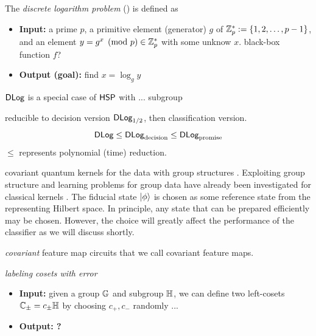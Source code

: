 \begin{problem}\label{prm:dlog}
	The \emph{discrete logarithm problem} (\dlog) is defined as
	\begin{itemize}
		\item \textbf{Input:} a prime $p$, a primitive element (generator) $g$ of $\mathbb{Z}_p^*:=\qty{1,2,\dots,p-1}$, and an element $y=g^x \pmod{p} \in\mathbb{Z}_p^*$ with some unknow $x$. black-box function $f$?
		\item \textbf{Output (goal):} find $x=\log_g y$
	\end{itemize}
	$\textsf{DLog}$ is a special case of $\textsf{HSP}$ with ... subgroup 
\end{problem}
reducible to decision version $\textsf{DLog}_{1/2}$, then classification version.
\begin{equation}
	\textsf{DLog} \le \textsf{DLog}_{\textup{decision}} \le \textsf{DLog}_{\textup{promise}}
\end{equation}
$\le$ represents polynomial (time) reduction.

covariant quantum kernels for the data with group structures
\cite{glickCovariantQuantumKernels2021}.
Exploiting group structure and learning problems for group data have already been investigated for classical kernels \cite{kondorGroupTheoreticalMethods2008}.
The fiducial state $\ket{\phi}$ is chosen as some reference state from the representing Hilbert space. 
In principle, any state that can be prepared efficiently may be chosen. 
However, the choice will greatly affect the performance of the classifier as we will discuss shortly.
\begin{definition}[Covariant]\label{def:covariant}
	\emph{covariant}
	feature map circuits that we call covariant feature maps. 
\end{definition}
\begin{problem}
	\emph{labeling cosets with error}
	\begin{itemize}
		\item 
		\textbf{Input:} given a group $\mathbb{G}$ and subgroup $\mathbb{H}$,
		we can define two left-cosets $\mathbb{C}_{\pm}=c_{\pm}\mathbb{H}$ by choosing $c_+,c_-$ randomly ...
		\item 
		\textbf{Output: ?} 
	\end{itemize}
\end{problem}

